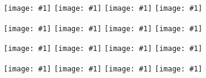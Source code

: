 \documentclass[portrait]{a0poster}
\date{}
\newcommand{\Bild}[1]{{\texttt{[image: \#1]}}}
\begin{document}
\centering
\Bild{1}
\Bild{16}
\Bild{9}
\Bild{7}

\Bild{5}
\Bild{8}
\Bild{12}
\Bild{6}

\Bild{10}
\Bild{4}
\Bild{13}
\Bild{2}

\Bild{11}
\Bild{15}
\Bild{14}
\Bild{3}
\end{document}
